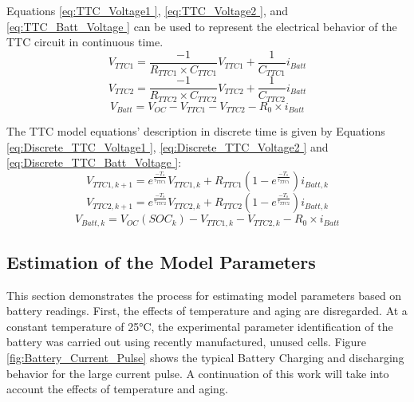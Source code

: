 Equations \ref{eq:TTC_Voltage1 }, \ref{eq:TTC_Voltage2 }, and \ref{eq:TTC_Batt_Voltage } can be used to represent the electrical behavior of the TTC circuit in continuous time.
\begin{equation}\label{eq:TTC_Voltage1 }
    V_{TTC1} = \frac{-1}{R_{TTC1}\times C_{TTC1}} V_{TTC1} + \frac{1}{C_{TTC1}} i_{Batt}
\end{equation}
\begin{equation}\label{eq:TTC_Voltage2 }
    V_{TTC2} = \frac{-1}{R_{TTC2}\times C_{TTC2}} V_{TTC2} + \frac{1}{C_{TTC2}} i_{Batt}
\end{equation}
\begin{equation}\label{eq:TTC_Batt_Voltage }
    V_{Batt} = V_{OC} -  V_{TTC1} - V_{TTC2} - R_{0}\times i_{Batt}
\end{equation}

The TTC model equations' description in discrete time is given by Equations \ref{eq:Discrete_TTC_Voltage1 }, \ref{eq:Discrete_TTC_Voltage2 } and \ref{eq:Discrete_TTC_Batt_Voltage }:
\begin{equation}\label{eq:Discrete_TTC_Voltage1 }
    V_{TTC1,k+1} = e^{\frac{-T_{s}}{\tau_{TTC1}}} V_{TTC1,k} + R_{TTC1}\left(1- e^{\frac{-T_{s}}{\tau_{TTC1}}}\right) i_{Batt,k}
\end{equation}
\begin{equation}\label{eq:Discrete_TTC_Voltage2 }
    V_{TTC2,k+1} = e^{\frac{-T_{s}}{\tau_{TTC2}}} V_{TTC2,k} + R_{TTC2}\left(1- e^{\frac{-T_{s}}{\tau_{TTC2}}}\right) i_{Batt,k}
\end{equation}
\begin{equation}\label{eq:Discrete_TTC_Batt_Voltage }
    V_{Batt,k} = V_{OC}(SOC_{k}) -  V_{TTC1,k}-  V_{TTC2,k} - R_{0}\times i_{Batt}
\end{equation}


\subsection{Estimation of the Model Parameters}
This section demonstrates the process for estimating model parameters based on battery readings. First, the effects of temperature and aging are disregarded. At a constant temperature of 25°C, the experimental parameter identification of the battery was carried out using recently manufactured, unused cells. Figure \ref{fig:Battery_Current_Pulse} shows the typical Battery Charging and discharging behavior for the large current pulse. A continuation of this work will take into account the effects of temperature and aging.
